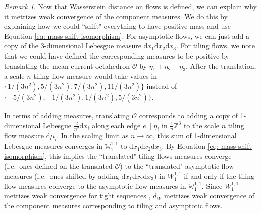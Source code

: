\documentclass[11pt]{article}
\theoremstyle{remark}
\newtheorem{rem}[thm]{Remark}
\theoremstyle{definition}
\newcommand{\mc}[1]{\mathcal{#1}}
\newcommand{\m}[1]{\mathbb{#1}}
\newcommand{\dd}{\mathrm{d}}
\begin{document}
\begin{rem}\label{rem:weak convergence for signed +}
    Now that Wasserstein distance on flows is defined, we can explain why it metrizes weak convergence of the component measures. We do this by explaining how we could ``shift" everything to have positive mass and use Equation \eqref{eq: mass shift isomorphism}. For asymptotic flows, we can just add a copy of the 3-dimensional Lebesgue measure $\dd x_1 \dd x_2 \dd x_3$. For tiling flows, we note that we could have defined the corresponding measures to be positive by translating the mean-current octahedron $\mc O$ by $\eta_1 + \eta_2 + \eta_3$. After the translation, a scale $n$ tiling flow measure would take values in $\{1/(3n^2),5/(3n^2),7/(3n^2),11/(3n^2)\}$ instead of $\{-5/(3n^2),-1/(3n^2),1/(3n^2),5/(3n^2)\}$. 
    
    In terms of adding measures, translating $\mc O$ corresponds to adding a copy of 1-dimensional Lebesgue $\frac{2}{n^2} \dd x_i$ along each edge $e\parallel \eta_i$ in $\frac{1}{n} \m Z^3$ to the scale $n$ tiling flow measure $\dd \mu_i$. In the scaling limit as $n\to\infty$, this sum of 1-dimensional Lebesgue measures converges in $\m W_1^{1,1}$ to $\dd x_1 \dd x_2 \dd x_3$. By Equation \eqref{eq: mass shift isomorphism}, this implies the ``translated" tiling flows measures converge (i.e.\ ones defined on the translated $\mc O$) to the ``translated" asymptotic flow measures (i.e.\ ones shifted by adding $\dd x_1 \dd x_2 \dd x_3)$ in $W_1^{1,1}$ if and only if the tiling flow measures converge to the asymptotic flow measures in $\m W_1^{1,1}$. Since $W_1^{1,1}$ metrizes weak convergence for tight sequences \cite[Theorem 13]{Piccoli2014-vy}, $d_W$ metrizes weak convergence of the component measures corresponding to tiling and asymptotic flows.
\end{rem}
\end{document}
